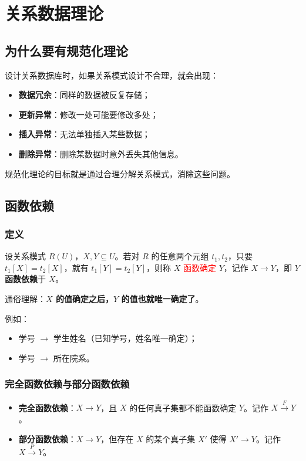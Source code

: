 \documentclass{../../note}
\begin{document}
\section{关系数据理论}

\subsection{为什么要有规范化理论}

设计关系数据库时，如果关系模式设计不合理，就会出现：

\begin{itemize}
  \item \textbf{数据冗余}：同样的数据被反复存储；
  \item \textbf{更新异常}：修改一处可能要修改多处；
  \item \textbf{插入异常}：无法单独插入某些数据；
  \item \textbf{删除异常}：删除某数据时意外丢失其他信息。
\end{itemize}

规范化理论的目标就是通过合理分解关系模式，消除这些问题。

\subsection{函数依赖}

\subsubsection{定义}

设关系模式 $R(U)$，$X, Y \subseteq U$。若对 $R$ 的任意两个元组 $t_1, t_2$，只要 $t_1[X] = t_2[X]$，就有 $t_1[Y] = t_2[Y]$，则称 $X$ \textcolor{red}{函数确定} $Y$，记作 $X \to Y$，即 $Y$ \textbf{函数依赖}于 $X$。

通俗理解：\textbf{$X$ 的值确定之后，$Y$ 的值也就唯一确定了}。

例如：
\begin{itemize}
  \item 学号 $\to$ 学生姓名（已知学号，姓名唯一确定）；
  \item 学号 $\to$ 所在院系。
\end{itemize}

\subsubsection{完全函数依赖与部分函数依赖}

\begin{itemize}
  \item \textbf{完全函数依赖}：$X \to Y$，且 $X$ 的任何真子集都不能函数确定 $Y$。记作 $X \xrightarrow{F} Y$。
  \item \textbf{部分函数依赖}：$X \to Y$，但存在 $X$ 的某个真子集 $X'$ 使得 $X' \to Y$。记作 $X \xrightarrow{P} Y$。
\end{itemize}
\end{document}
